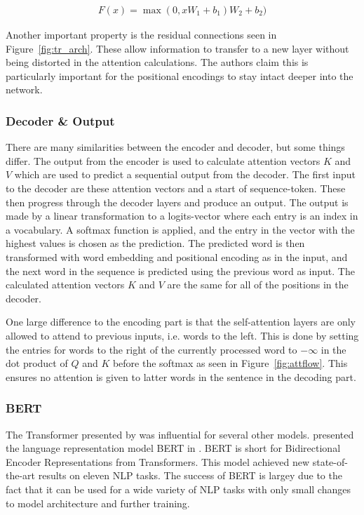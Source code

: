 \begin{align}
    F(x) = \max(0, x W_1 + b_1)W_2 + b_2)\label{eq:attmlp}
\end{align}

Another important property is the residual connections seen in Figure~\ref{fig:tr_arch}. These allow information to transfer to a new layer without being distorted in the attention calculations. The authors \citet{NIPS2017_7181} claim this is particularly important for the positional encodings to stay intact deeper into the network. 



\subsubsection{Decoder \& Output}

There are many similarities between the encoder and decoder, but some things differ. The output from the encoder is used to calculate attention vectors $K$ and $V$ which are used to predict a sequential output from the decoder. The first input to the decoder are these attention vectors and a start of sequence-token. These then progress through the decoder layers and produce an output. The output is made by a linear transformation to a logits-vector where each entry is an index in a vocabulary. A softmax function is applied, and the entry in the vector with the highest values is chosen as the prediction. The predicted word is then transformed with word embedding and positional encoding as in the input, and the next word in the sequence is predicted using the previous word as input. The calculated attention vectors $K$ and $V$ are the same for all of the positions in the decoder. 

One large difference to the encoding part is that the self-attention layers are only allowed to attend to previous inputs, i.e. words to the left. This is done by setting the entries for words to the right of the currently processed word to $-\infty$ in the dot product of $Q$ and $K$ before the softmax as seen in Figure~\ref{fig:attflow}. This ensures no attention is given to latter words in the sentence in the decoding part. 

\subsubsection{BERT}

The Transformer presented by \citeauthor{NIPS2017_7181} was influential for several other models. \citeauthor{devlin2018bert} presented the language representation model BERT in \citeyear{devlin2018bert}. BERT is short for Bidirectional Encoder Representations from Transformers. This model achieved new state-of-the-art results on eleven NLP tasks. The success of BERT is largey due to the fact that it can be used for a wide variety of NLP tasks with only small changes to model architecture and further training.

